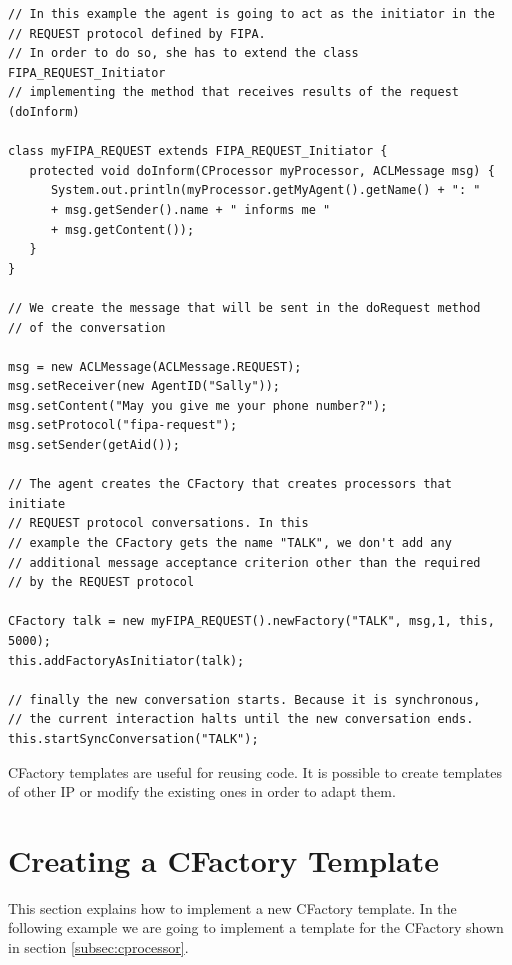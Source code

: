 \begin{lstlisting}[style=Java]
// In this example the agent is going to act as the initiator in the
// REQUEST protocol defined by FIPA.
// In order to do so, she has to extend the class FIPA_REQUEST_Initiator
// implementing the method that receives results of the request (doInform)

class myFIPA_REQUEST extends FIPA_REQUEST_Initiator {
   protected void doInform(CProcessor myProcessor, ACLMessage msg) {
      System.out.println(myProcessor.getMyAgent().getName() + ": "
      + msg.getSender().name + " informs me "
      + msg.getContent());
   }
}

// We create the message that will be sent in the doRequest method
// of the conversation

msg = new ACLMessage(ACLMessage.REQUEST);
msg.setReceiver(new AgentID("Sally"));
msg.setContent("May you give me your phone number?");
msg.setProtocol("fipa-request");
msg.setSender(getAid());

// The agent creates the CFactory that creates processors that initiate
// REQUEST protocol conversations. In this
// example the CFactory gets the name "TALK", we don't add any
// additional message acceptance criterion other than the required
// by the REQUEST protocol

CFactory talk = new myFIPA_REQUEST().newFactory("TALK", msg,1, this, 5000);
this.addFactoryAsInitiator(talk);

// finally the new conversation starts. Because it is synchronous,
// the current interaction halts until the new conversation ends.
this.startSyncConversation("TALK");
\end{lstlisting}


CFactory templates are useful for reusing code. It is possible to create templates of other IP or modify the existing ones in order to adapt them.

\section{Creating a CFactory Template}
This section explains how to implement a new CFactory template. In the following example we are going to implement a template for the CFactory shown in section \ref{subsec:cprocessor}.

